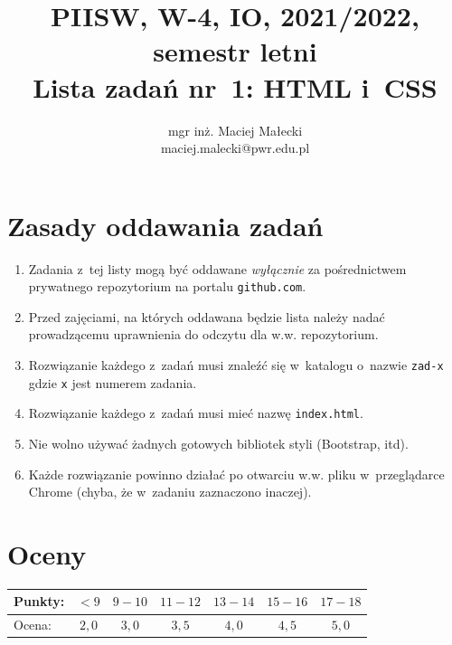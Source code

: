 \documentclass[12pt]{article}
\title{PIISW, W-4, IO, 2021/2022, semestr letni\\Lista zadań nr~1: HTML i~CSS}
\author{mgr inż. Maciej Małecki\\ \small maciej.malecki@pwr.edu.pl}
\begin{document}
    \maketitle

    \section*{Zasady oddawania zadań}
        \begin{enumerate}
            \item Zadania z~tej listy mogą być oddawane \emph{wyłącznie} za pośrednictwem prywatnego repozytorium na portalu \texttt{github.com}.
            \item Przed zajęciami, na których oddawana będzie lista należy nadać prowadzącemu uprawnienia do odczytu dla w.w. repozytorium.
            \item Rozwiązanie każdego z~zadań musi znaleźć się w~katalogu o~nazwie \texttt{zad-x} gdzie \texttt{x} jest numerem zadania.
            \item Rozwiązanie każdego z~zadań musi mieć nazwę \texttt{index.html}.
            \item Nie wolno używać żadnych gotowych bibliotek styli (Bootstrap, itd).
            \item Każde rozwiązanie powinno działać po otwarciu w.w. pliku w~przeglądarce Chrome (chyba, że w~zadaniu zaznaczono inaczej).
        \end{enumerate}

    \section*{Oceny}
    \begin{tabular}{|l|c|c|c|c|c|c|}
        \hline
        Punkty: & $<9$ & $9-10$ & $11-12$ & $13-14$ & $15-16$ & $17-18$\\
        \hline
        Ocena:  & $2,0$ & $3,0$ & $3,5$ & $4,0$ & $4,5$ & $5,0$\\
        \hline
    \end{tabular}
\end{document}
